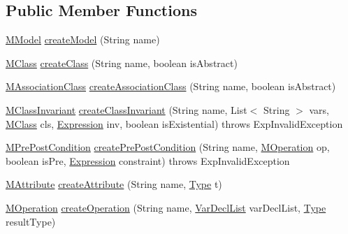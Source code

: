 \subsection*{Public Member Functions}
\begin{DoxyCompactItemize}
\item 
\hyperlink{classorg_1_1tzi_1_1use_1_1uml_1_1mm_1_1_m_model}{M\-Model} \hyperlink{classorg_1_1tzi_1_1use_1_1uml_1_1mm_1_1_model_factory_a5f0839c57ef4c1950f2aa14bac1ad30f}{create\-Model} (String name)
\item 
\hyperlink{interfaceorg_1_1tzi_1_1use_1_1uml_1_1mm_1_1_m_class}{M\-Class} \hyperlink{classorg_1_1tzi_1_1use_1_1uml_1_1mm_1_1_model_factory_ac2862472ff5a5aabd155adab71c3a849}{create\-Class} (String name, boolean is\-Abstract)
\item 
\hyperlink{interfaceorg_1_1tzi_1_1use_1_1uml_1_1mm_1_1_m_association_class}{M\-Association\-Class} \hyperlink{classorg_1_1tzi_1_1use_1_1uml_1_1mm_1_1_model_factory_ad46af0fd60f903b0327ec700ec3dbd67}{create\-Association\-Class} (String name, boolean is\-Abstract)
\item 
\hyperlink{classorg_1_1tzi_1_1use_1_1uml_1_1mm_1_1_m_class_invariant}{M\-Class\-Invariant} \hyperlink{classorg_1_1tzi_1_1use_1_1uml_1_1mm_1_1_model_factory_a2afc133d21c856e25e35b059d174c823}{create\-Class\-Invariant} (String name, List$<$ String $>$ vars, \hyperlink{interfaceorg_1_1tzi_1_1use_1_1uml_1_1mm_1_1_m_class}{M\-Class} cls, \hyperlink{classorg_1_1tzi_1_1use_1_1uml_1_1ocl_1_1expr_1_1_expression}{Expression} inv, boolean is\-Existential)  throws Exp\-Invalid\-Exception 	
\item 
\hyperlink{classorg_1_1tzi_1_1use_1_1uml_1_1mm_1_1_m_pre_post_condition}{M\-Pre\-Post\-Condition} \hyperlink{classorg_1_1tzi_1_1use_1_1uml_1_1mm_1_1_model_factory_ab1ac29329492347973d591312b85e362}{create\-Pre\-Post\-Condition} (String name, \hyperlink{classorg_1_1tzi_1_1use_1_1uml_1_1mm_1_1_m_operation}{M\-Operation} op, boolean is\-Pre, \hyperlink{classorg_1_1tzi_1_1use_1_1uml_1_1ocl_1_1expr_1_1_expression}{Expression} constraint)  throws Exp\-Invalid\-Exception     
\item 
\hyperlink{classorg_1_1tzi_1_1use_1_1uml_1_1mm_1_1_m_attribute}{M\-Attribute} \hyperlink{classorg_1_1tzi_1_1use_1_1uml_1_1mm_1_1_model_factory_addec8eaa3f3b0410bc1c250ae08a9821}{create\-Attribute} (String name, \hyperlink{interfaceorg_1_1tzi_1_1use_1_1uml_1_1ocl_1_1type_1_1_type}{Type} t)
\item 
\hyperlink{classorg_1_1tzi_1_1use_1_1uml_1_1mm_1_1_m_operation}{M\-Operation} \hyperlink{classorg_1_1tzi_1_1use_1_1uml_1_1mm_1_1_model_factory_a5aae544d99341ddfb73f96688821e256}{create\-Operation} (String name, \hyperlink{classorg_1_1tzi_1_1use_1_1uml_1_1ocl_1_1expr_1_1_var_decl_list}{Var\-Decl\-List} var\-Decl\-List, \hyperlink{interfaceorg_1_1tzi_1_1use_1_1uml_1_1ocl_1_1type_1_1_type}{Type} result\-Type)

\end{DoxyCompactItemize}
